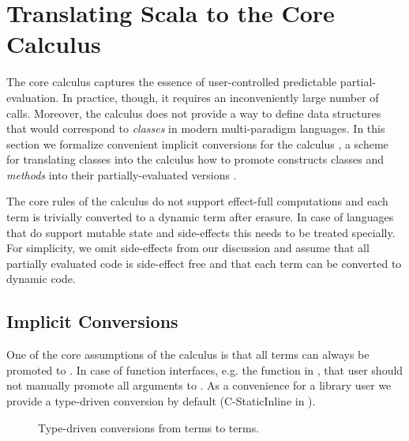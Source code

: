 \section{Translating Scala to the Core Calculus}
\label{sct:scala-translation}


The core calculus  captures the essence of user-controlled
 predictable partial-evaluation. In practice, though, it requires an inconveniently large number
 of  calls. Moreover, the calculus does not provide a way to define
 data structures that would correspond to \emph{classes} in modern multi-paradigm languages.
 In this section we formalize convenient implicit conversions for the calculus , a scheme for
 translating classes into the calculus how to promote constructs classes and \emph{methods} into their
 partially-evaluated versions .


The core rules of the calculus do not support effect-full computations and each
  term is trivially converted to a dynamic term after erasure.
 In case of languages that do support mutable state and side-effects this needs to
 be treated specially. For simplicity, we omit side-effects from our discussion and
 assume that all partially evaluated code is side-effect free and that each
  term can be converted to dynamic code.

\subsection{Implicit Conversions}
\label{sct:conversions}

One of the core assumptions of the calculus is that all  terms can
 always be promoted to . In case of function interfaces, e.g. the
  function in , that user should not manually
 promote all arguments to . As a convenience for a library user
 we provide a type-driven conversion by default (C-StaticInline in ).

\begin{figure}

    {\Gamma \ts {}}

\caption{Type-driven conversions from  terms to  terms.}
\label{fig:conversions}
\end{figure}

